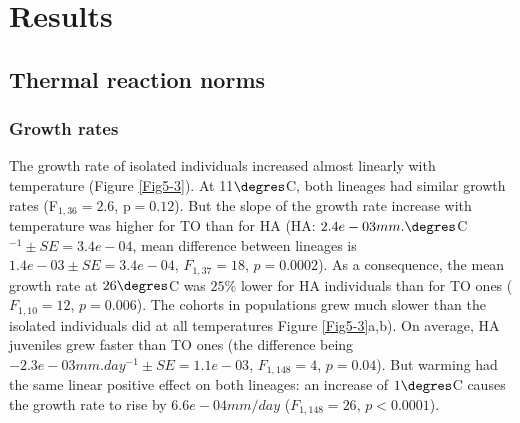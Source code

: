 \section{Results}

\subsection{Thermal reaction norms}

\subsubsection{Growth rates}

The growth rate of isolated individuals increased almost linearly with
temperature (Figure \ref{Fig5-3}). At 11$\degres$C, both lineages had similar
growth rates (F$_{1,36}=2.6$, p$=0.12$). But the slope of the growth rate
increase with temperature was higher for TO than for HA (HA: $2.4e-03
mm.\degres$C$^{-1} \pm SE = 3.4e-04$, mean difference between lineages is
$1.4e-03 \pm SE = 3.4e-04$, $F_{1,37} = 18$, $p = 0.0002$). As a consequence,
the mean growth rate at $26\degres$C was $25\%$ lower for HA individuals than
for TO ones ($F_{1,10} = 12$, $p = 0.006$). The cohorts in populations grew much
slower than the isolated individuals did at all temperatures Figure \ref{Fig5-3}a,b). On
average, HA juveniles grew faster than TO ones (the difference being $-2.3e-03
mm.day^{-1} \pm SE = 1.1e-03$, $F_{1,148}=4$, $p=0.04$). But warming had the
same linear positive effect on both lineages: an increase of $1\degres$C causes
the growth rate to rise by $6.6e-04 mm/day$ ($F_{1,148}=26$, $p<0.0001$).

